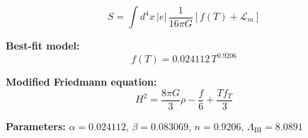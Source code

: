 
\begin{equation}
  S = \int d^4x \, |e| \, \frac{1}{16\pi G} \left[ f(T) + \mathcal{L}_m \right]
\end{equation}

\textbf{Best-fit model:}
\begin{equation}
  f(T) = 0.024112 \, T^{0.9206}
\end{equation}

\textbf{Modified Friedmann equation:}
\begin{equation}
  H^2 = \frac{8\pi G}{3} \rho - \frac{f}{6} + \frac{T f_T}{3}
\end{equation}

\textbf{Parameters:}
$\alpha = 0.024112$, \quad
$\beta = 0.083069$, \quad
$n = 0.9206$, \quad
$\Lambda_{\text{BI}} = 8.0891$